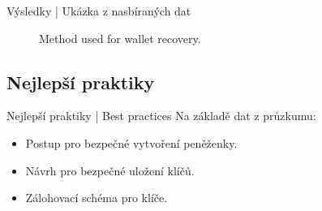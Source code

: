 \documentclass{beamer}
\begin{document}
\begin{darkframes}
\begin{frame}{Výsledky | Ukázka z nasbíraných dat}
\begin{center}
\begin{figure}[H]
\caption{Method used for wallet recovery.}
\label{chart:recoverymethod}\end{figure}\end{center}    
     
    \end{frame}
    
    
    \subsection{Nejlepší praktiky}
    \begin{frame}{Nejlepší praktiky | Best practices}
     Na základě dat z průzkumu:
     \begin{itemize}
     \item Postup pro bezpečné vytvoření peněženky.
     \item Návrh pro bezpečné uložení klíčů.
     \item Zálohovací schéma pro klíče.
     \end{itemize}
    \end{frame}
  \end{darkframes}
  
    
\end{document}

